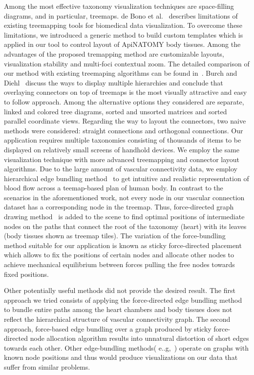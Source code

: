 Among the most effective taxonomy visualization techniques are space-filling diagrams, and in particular, treemaps.
de Bono et al.~\cite{BGS12} describes limitations of existing treemapping tools for biomedical data visualization. To overcome these limitations, we introduced a generic method to build custom templates which is applied in our tool to control layout of ApiNATOMY body tissues. Among the advantages of the proposed tremapping method are customizable layouts, visualization stability and multi-foci contextual zoom. The detailed comparison of our method with existing treemaping algorithms can be found in~\cite{KBK14}.
Burch and Diehl~\cite{BD06} discuss the ways to display multiple hierarchies and conclude that overlaying connectors on top of treemaps is the most visually attractive and easy to follow approach. Among the alternative options they considered are separate, linked and colored tree diagrams, sorted and unsorted matrices and sorted parallel coordinate views. Regarding the way to layout the connectors, two naive methods were considered: straight connections and orthogonal connections. %
Our application requires multiple taxonomies consisting of thousands of items to be displayed on relatively small screens of handhold devices. We employ the same visualization technique with more advanced treemapping and connector layout algorithms. Due to the large amount of vascular connectivity data, we employ hierarchical edge bundling method~\cite{Hol06} to get intuitive and realistic representation of blood flow across a teemap-based plan of human body.
In contrast to the scenarios in the aforementioned work, not every node in our vascular connection dataset has a corresponding node in the treemap. Thus, force-directed graph drawing method~\cite{BET+99} is added to the scene to find optimal positions of intermediate nodes on the paths that connect the root of the taxonomy (heart) with its leaves (body tissues shown as treemap tiles). The variation of the force-bundling method suitable for our application is known as sticky force-directed placement~\cite{FR91} which allows to fix the positions of certain nodes and allocate other nodes to achieve mechanical equilibrium between forces pulling the free nodes towards fixed positions.

Other potentially useful methods did not provide the desired result. The first approach we tried consists of applying the
force-directed edge bundling method~\cite{HW09} to bundle entire paths among the heart chambers and body tissues does not reflect the hierarchical structure of vascular connectivity graph. The second approach, force-based edge bundling over a graph produced by sticky force-directed node allocation algorithm results into unnatural distortion of short edges towards each other. Other edge-bundling methods( e..g,~\cite{GHN+11}\cite{HET12}\cite{SHH11}) operate on graphs with known node positions and thus would produce visualizations on our data that suffer from similar problems.


